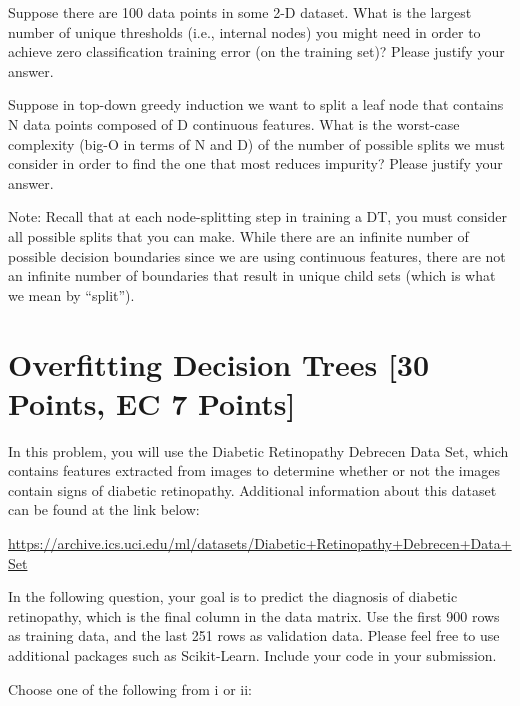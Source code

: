 \subproblem[5] Suppose there are 100 data points in some 2-D dataset. What is the largest number of unique thresholds (i.e., internal nodes) you might need in order to achieve zero classification training error (on the training set)? Please
justify your answer.

\begin{solution}

\end{solution}

\problem[4] Suppose in top-down greedy induction we want to split a leaf node that contains N data points composed of
D continuous features. What is the worst-case
complexity (big-O in terms of N and D) of the number of possible splits we must consider in order to find the one that most reduces impurity? Please justify your answer.

Note: Recall that at each node-splitting step in training a DT, you must consider all possible splits that you can make. While there are an infinite number of possible decision boundaries since we are using continuous features, there are not an infinite number of boundaries that result in unique child sets (which is what we mean by ``split'').

\begin{solution}
   
\end{solution}


\newpage


\section{Overfitting Decision Trees [30 Points, EC 7 Points]}

In this problem, you will use the Diabetic Retinopathy Debrecen Data Set, which contains features extracted from images to determine whether or not the images contain signs of diabetic retinopathy. Additional information about this dataset can be found at the link below:

\url{https://archive.ics.uci.edu/ml/datasets/Diabetic+Retinopathy+Debrecen+Data+Set}

In the following question, your goal is to predict the diagnosis of diabetic retinopathy, which is the final column in the data matrix.  Use the first 900 rows as training data, and the last
251 rows as validation data. Please feel free to use additional packages such as Scikit-Learn. Include your code in your submission.


\indent\problem[10] \smallskip 
Choose one of the following from i or ii: 

